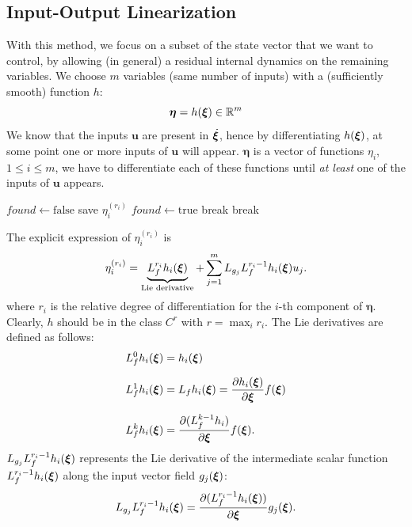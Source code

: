 \documentclass[10pt, a4paper]{report}
\begin{document}
\subsection{Input-Output Linearization}
With this method, we focus on a subset of the state vector that we want to control, by allowing (in general) a residual internal dynamics on the remaining variables. We choose $m$ variables (same number of inputs) with a (sufficiently smooth) function $h$:\begin{equation}
    \boldsymbol{\eta}=h({\boldsymbol{\xi}})\in{\mathbb R}^m 
\end{equation}
We know that the inputs $\mathbf u$ are present in $\dot{{\boldsymbol{\xi}}}$, hence by differentiating $h({\boldsymbol{\xi}})$, at some point one or more inputs of $\mathbf u$ will appear. $\boldsymbol{\eta}$ is a vector of functions $\eta_i$, $1\le i \le m$, we have to differentiate each of these functions until \textit{at least} one of the inputs of $\mathbf u$ appears.
\begin{algorithm}[H]
\caption{Input-Output Linearization}\label{alg:input_output_lin}
\begin{algorithmic}[1]
\State $found \gets \text{false}$
\State save $\eta_i^{(r_i)}$
\State $found \gets \text{true}$
\State break
\EndIf
\EndFor
{}
\State break
\EndIf
\EndFor
\EndFor
\end{algorithmic}
\end{algorithm}
\noindent The explicit expression of $\eta_i^{(r_i)}$ is\begin{equation}\label{eta_i}
    \eta_i^{(r_i)}=\underbrace{L_f^{r_i}h_i({\boldsymbol{\xi}})}_{\text{Lie derivative}}+\sum_{j=1}^mL_{g_j}L_f^{r_i-1}h_i({\boldsymbol{\xi}})u_j.
\end{equation}
where $r_i$ is the relative degree of differentiation for the $i$-th component of $\boldsymbol{\eta}$. Clearly, $h$ should be in the class $C^r$ with $r=\max_ir_i$. The Lie derivatives are defined as follows:\begin{align}
    &L_f^0h_i({\boldsymbol{\xi}})=h_i({\boldsymbol{\xi}})\\[1.5ex]
    &L_f^1h_i({\boldsymbol{\xi}})=L_fh_i({\boldsymbol{\xi}}) = \frac{\partial h_i({\boldsymbol{\xi}})}{\partial {\boldsymbol{\xi}}}f({\boldsymbol{\xi}})\\[1.5ex]
    &L_f^{k}h_i({\boldsymbol{\xi}}) = \frac{\partial (L_f^{k-1}h_i)}{\partial {\boldsymbol{\xi}}}f({\boldsymbol{\xi}}).
\end{align}
$L_{g_j} L_f^{r_i - 1} h_i({\boldsymbol{\xi}})$ represents the Lie derivative of the intermediate scalar function $L_f^{r_i - 1} h_i({\boldsymbol{\xi}})$ along the input vector field $g_j({\boldsymbol{\xi}})$:\begin{equation}
    L_{g_j} L_f^{r_i - 1} h_i({\boldsymbol{\xi}}) = \frac{\partial (L_f^{r_i - 1} h_i({\boldsymbol{\xi}}))}{\partial {\boldsymbol{\xi}}} g_j({\boldsymbol{\xi}}).
\end{equation}
\end{document}
